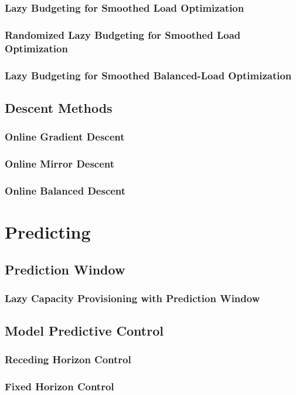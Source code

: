 \subsubsection{Lazy Budgeting for Smoothed Load Optimization}

\subsubsection{Randomized Lazy Budgeting for Smoothed Load Optimization}

\subsubsection{Lazy Budgeting for Smoothed Balanced-Load Optimization}

\subsection{Descent Methods}

\subsubsection{Online Gradient Descent}

\subsubsection{Online Mirror Descent}

\subsubsection{Online Balanced Descent}

\section{Predicting}

\subsection{Prediction Window}

\subsubsection{Lazy Capacity Provisioning with Prediction Window}

\subsection{Model Predictive Control}

\subsubsection{Receding Horizon Control}

\subsubsection{Fixed Horizon Control}

